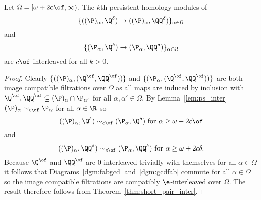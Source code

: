 
\begin{lemma}
  Let $\Omega = [\omega+2c\of, \infty)$.
  The $k$th persistent homology modules of
  \[ \{((\P)_\alpha, \Q^\delta)\to ((\P)_\alpha, \QQ^\delta)\}_{\alpha\in\Omega} \]
  and
  \[ \{(\P_\alpha, \Q^\delta)\to (\P_\alpha,\QQ^\delta)\}_{\alpha\in\Omega} \]
  are $c\of$-interleaved for all $k > 0$.
\end{lemma}
\begin{proof}
  Clearly $\{((\P)_\alpha, (\Q^\of, \QQ^\of))\}$ and $\{(\P_\alpha, (\Q^\of, \QQ^\of))\}$ are both image compatible filtrations over $\Omega$ as all maps are induced by inclusion with $\Q^\of, \QQ^\of\subseteq (\P)_\alpha\cap \P_{\alpha'}$ for all $\alpha,\alpha'\in\Omega$.
  By Lemma~\ref{lem:ps_inter} $(\P)_\alpha\sim_{c\of} \P_\alpha$ for all $\alpha\in\R$ so
  \[ ((\P)_\alpha, \Q^\delta)\sim_{c\of} (\P_\alpha, \Q^\delta)\text{ for } \alpha \geq \omega - 2c\of\]
  and
  \[ ((\P)_\alpha, \QQ^\delta)\sim_{c\of} (\P_\alpha, \QQ^\delta)\text{ for }\alpha \geq \omega + 2c\delta.\]
  Because $\Q^\of$ and $\QQ^\of$ are $0$-interleaved trivially with themselves for all $\alpha\in\Omega$ it follows that Diagrams~\ref{dgm:fabgcd} and~\ref{dgm:gcdfab} commute for all $\alpha\in\Omega$ so the image compatible filtrations are compatibly $\e$-interleaved over $\Omega$.
  The result therefore follows from Theorem~\ref{thm:short_pair_inter}.

\end{proof}
